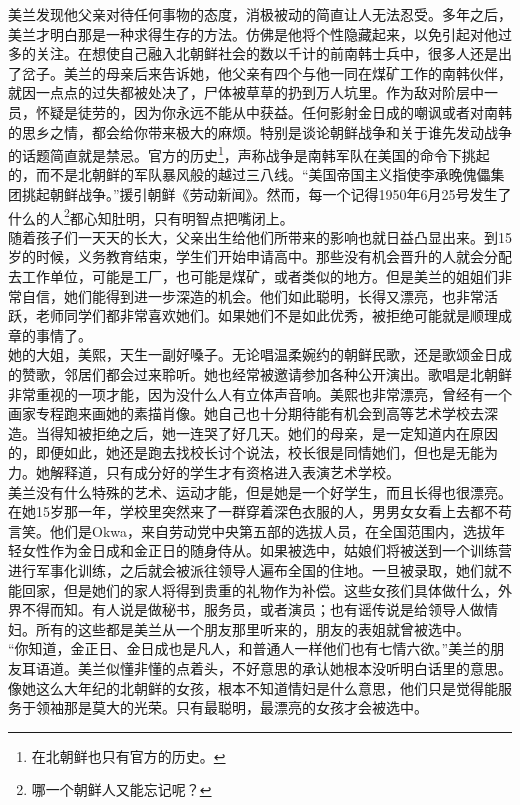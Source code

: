 美兰发现他父亲对待任何事物的态度，消极被动的简直让人无法忍受。多年之后，美兰才明白那是一种求得生存的方法。仿佛是他将个性隐藏起来，以免引起对他过多的关注。在想使自己融入北朝鲜社会的数以千计的前南韩士兵中，很多人还是出了岔子。美兰的母亲后来告诉她，他父亲有四个与他一同在煤矿工作的南韩伙伴，就因一点点的过失都被处决了，尸体被草草的扔到万人坑里。作为敌对阶层中一员，怀疑是徒劳的，因为你永远不能从中获益。任何影射金日成的嘲讽或者对南韩的思乡之情，都会给你带来极大的麻烦。特别是谈论朝鲜战争和关于谁先发动战争的话题简直就是禁忌。官方的历史\footnote{在北朝鲜也只有官方的历史。}，声称战争是南韩军队在美国的命令下挑起的，而不是北朝鲜的军队暴风般的越过三八线。“美国帝国主义指使李承晚傀儡集团挑起朝鲜战争。”援引朝鲜《劳动新闻》。然而，每一个记得1950年6月25号发生了什么的人\footnote{哪一个朝鲜人又能忘记呢？}都心知肚明，只有明智点把嘴闭上。\\

随着孩子们一天天的长大，父亲出生给他们所带来的影响也就日益凸显出来。到15岁的时候，义务教育结束，学生们开始申请高中。那些没有机会晋升的人就会分配去工作单位，可能是工厂，也可能是煤矿，或者类似的地方。但是美兰的姐姐们非常自信，她们能得到进一步深造的机会。他们如此聪明，长得又漂亮，也非常活跃，老师同学们都非常喜欢她们。如果她们不是如此优秀，被拒绝可能就是顺理成章的事情了。\\

她的大姐，美熙，天生一副好嗓子。无论唱温柔婉约的朝鲜民歌，还是歌颂金日成的赞歌，邻居们都会过来聆听。她也经常被邀请参加各种公开演出。歌唱是北朝鲜非常重视的一项才能，因为没什么人有立体声音响。美熙也非常漂亮，曾经有一个画家专程跑来画她的素描肖像。她自己也十分期待能有机会到高等艺术学校去深造。当得知被拒绝之后，她一连哭了好几天。她们的母亲，是一定知道内在原因的，即便如此，她还是跑去找校长讨个说法，校长很是同情她们，但也是无能为力。她解释道，只有成分好的学生才有资格进入表演艺术学校。\\

美兰没有什么特殊的艺术、运动才能，但是她是一个好学生，而且长得也很漂亮。在她15岁那一年，学校里突然来了一群穿着深色衣服的人，男男女女看上去都不苟言笑。他们是Okwa，来自劳动党中央第五部的选拔人员，在全国范围内，选拔年轻女性作为金日成和金正日的随身侍从。如果被选中，姑娘们将被送到一个训练营进行军事化训练，之后就会被派往领导人遍布全国的住地。一旦被录取，她们就不能回家，但是她们的家人将得到贵重的礼物作为补偿。这些女孩们具体做什么，外界不得而知。有人说是做秘书，服务员，或者演员；也有谣传说是给领导人做情妇。所有的这些都是美兰从一个朋友那里听来的，朋友的表姐就曾被选中。\\

“你知道，金正日、金日成也是凡人，和普通人一样他们也有七情六欲。”美兰的朋友耳语道。美兰似懂非懂的点着头，不好意思的承认她根本没听明白话里的意思。像她这么大年纪的北朝鲜的女孩，根本不知道情妇是什么意思，他们只是觉得能服务于领袖那是莫大的光荣。只有最聪明，最漂亮的女孩才会被选中。\\

